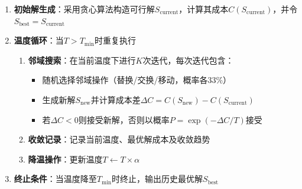 \begin{enumerate}
\begin{enumerate}
        \item \textbf{初始解生成}：采用贪心算法构造可行解$S_{\text{current}}$，计算其成本$C(S_{\text{current}})$，并令$S_{\text{best}}=S_{\text{current}}$
        
        \item \textbf{温度循环}：当$T > T_{\min}$时重复执行
        \begin{enumerate}
            \item \textbf{邻域搜索}：在当前温度下进行$K$次迭代，每次迭代包含：
            \begin{itemize}
                \item 随机选择邻域操作（替换/交换/移动，概率各33\%）
                \item 生成新解$S_{\text{new}}$并计算成本差$\Delta C = C(S_{\text{new}}) - C(S_{\text{current}})$
                \item 若$\Delta C < 0$则接受新解，否则以概率$P=\exp(-\Delta C / T)$接受
            \end{itemize}
            
            \item \textbf{收敛记录}：记录当前温度、最优解成本及收敛趋势
            
            \item \textbf{降温操作}：更新温度$T \leftarrow T \times \alpha$
        \end{enumerate}
        
        \item \textbf{终止条件}：当温度降至$T_{\min}$时终止，输出历史最优解$S_{\text{best}}$
    \end{enumerate}
\end{enumerate}

